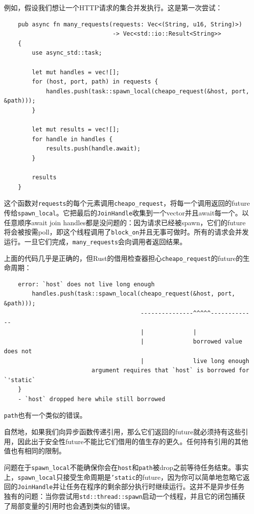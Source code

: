 例如，假设我们想让一个HTTP请求的集合并发执行。这是第一次尝试：
\begin{verbatim}
    pub async fn many_requests(requests: Vec<(String, u16, String)>)
                               -> Vec<std::io::Result<String>>
    {
        use async_std::task;

        let mut handles = vec![];
        for (host, port, path) in requests {
            handles.push(task::spawn_local(cheapo_request(&host, port, &path)));
        }

        let mut results = vec![];
        for handle in handles {
            results.push(handle.await);
        }

        results
    }
\end{verbatim}

这个函数对\texttt{requests}的每个元素调用\texttt{cheapo\_request}，将每一个调用返回的future传给\texttt{spawn\_local}。它把最后的\texttt{JoinHandle}收集到一个vector并且await每一个。以任意顺序await join handles都是没问题的：因为请求已经被spawn，它们的future将会被按需poll，即这个线程调用了\texttt{block\_on}并且无事可做时。所有的请求会并发运行。一旦它们完成，\texttt{many\_requests}会向调用者返回结果。

上面的代码几乎是正确的，但Rust的借用检查器担心\texttt{cheapo\_request}的future的生命周期：
\begin{verbatim}
    error: `host` does not live long enough
        handles.push(task::spawn_local(cheapo_request(&host, port, &path)));
                                       ---------------^^^^^-------------
                                       |              |
                                       |              borrowed value does not
                                       |              live long enough
                         argument requires that `host` is borrowed for `'static`
    }
    - `host` dropped here while still borrowed
\end{verbatim}

\texttt{path}也有一个类似的错误。

自然地，如果我们向异步函数传递引用，那么它们返回的future就必须持有这些引用，因此出于安全性future不能比它们借用的值生存的更久。任何持有引用的其他值也有相同的限制。

问题在于\texttt{spawn\_local}不能确保你会在\texttt{host}和\texttt{path}被drop之前等待任务结束。事实上，\texttt{spawn\_local}只接受生命周期是\texttt{'static}的future，因为你可以简单地忽略它返回的\texttt{JoinHandle}并让任务在程序的剩余部分执行时继续运行。这并不是异步任务独有的问题：当你尝试用\texttt{std::thread::spawn}启动一个线程，并且它的闭包捕获了局部变量的引用时也会遇到类似的错误。

